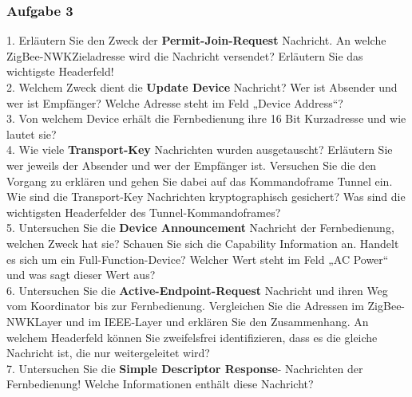     \subsubsection{Aufgabe 3}
    \begin{Fragen}
        1. Erläutern Sie den Zweck der \textbf{Permit-Join-Request} Nachricht. An welche ZigBee-NWKZieladresse wird die Nachricht versendet? 
        Erläutern Sie das wichtigste Headerfeld!\\
        
        2. Welchem Zweck dient die \textbf{Update Device} Nachricht? Wer ist Absender und wer ist
        Empfänger? Welche Adresse steht im Feld „Device Address“?\\
        
        3. Von welchem Device erhält die Fernbedienung ihre 16 Bit Kurzadresse und wie lautet sie?\\
        
        4. Wie viele \textbf{Transport-Key} Nachrichten wurden ausgetauscht? Erläutern Sie wer jeweils
        der Absender und wer der Empfänger ist. Versuchen Sie die den Vorgang zu erklären und
        gehen Sie dabei auf das Kommandoframe \grqq Tunnel\grqq{} ein. Wie sind die Transport-Key Nachrichten kryptographisch gesichert?
        Was sind die wichtigsten Headerfelder des Tunnel-Kommandoframes?\\
        
        5. Untersuchen Sie die \textbf{Device Announcement} Nachricht der Fernbedienung, welchen
        Zweck hat sie? Schauen Sie sich die \grqq Capability Information \grqq{} an. Handelt es sich um ein
        Full-Function-Device? Welcher Wert steht im Feld „AC Power“ und was sagt dieser Wert aus? \\
        
        6. Untersuchen Sie die \textbf{Active-Endpoint-Request} Nachricht und ihren Weg vom
        Koordinator bis zur Fernbedienung. Vergleichen Sie die Adressen im ZigBee-NWKLayer und im IEEE-Layer und erklären Sie den Zusammenhang. An welchem Headerfeld
        können Sie zweifelsfrei identifizieren, dass es die gleiche Nachricht ist, die nur weitergeleitet wird? \\
        
        7. Untersuchen Sie die \textbf{Simple Descriptor Response}- Nachrichten der Fernbedienung!
        Welche Informationen enthält diese Nachricht? \\
        \end{Fragen}
